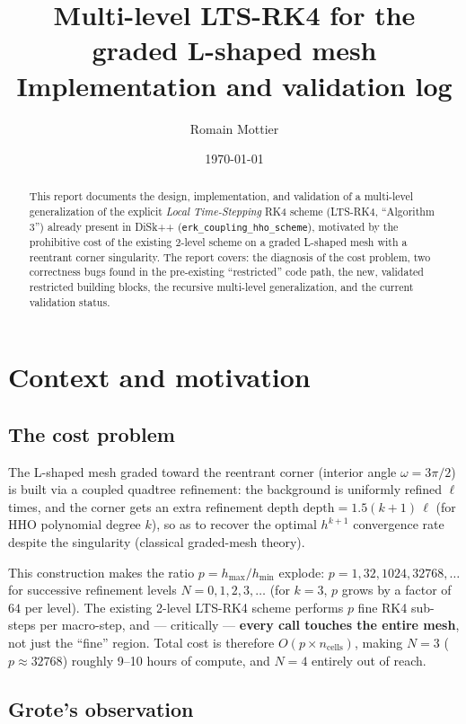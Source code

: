 \documentclass[11pt]{article}
\title{Multi-level LTS-RK4 for the graded L-shaped mesh\\
\large Implementation and validation log}
\author{Romain Mottier}
\date{\today}
\newcommand{\code}[1]{\texttt{#1}}
\begin{document}
\maketitle

\begin{abstract}
This report documents the design, implementation, and validation of a
multi-level generalization of the explicit \emph{Local Time-Stepping} RK4
scheme (LTS-RK4, ``Algorithm 3'') already present in DiSk++
(\code{erk\_coupling\_hho\_scheme}), motivated by the prohibitive cost of
the existing 2-level scheme on a graded L-shaped mesh with a reentrant
corner singularity. The report covers: the diagnosis of the cost problem,
two correctness bugs found in the pre-existing ``restricted'' code path,
the new, validated restricted building blocks, the recursive multi-level
generalization, and the current validation status.
\end{abstract}

\tableofcontents

\section{Context and motivation}

\subsection{The cost problem}

The L-shaped mesh graded toward the reentrant corner (interior angle
$\omega = 3\pi/2$) is built via a coupled quadtree refinement: the
background is uniformly refined $\ell$ times, and the corner gets an
extra refinement depth $\mathrm{depth} = 1.5(k+1)\,\ell$ (for HHO
polynomial degree $k$), so as to recover the optimal $h^{k+1}$
convergence rate despite the singularity (classical graded-mesh theory).

This construction makes the ratio $p = h_{\max}/h_{\min}$ explode:
$p = 1, 32, 1024, 32768,\dots$ for successive refinement levels
$N=0,1,2,3,\dots$ (for $k=3$, $p$ grows by a factor of $64$ per level).
The existing 2-level LTS-RK4 scheme performs $p$ fine RK4 sub-steps per
macro-step, and --- critically --- \textbf{every call touches the entire
mesh}, not just the ``fine'' region. Total cost is therefore
$O(p \times n_{\text{cells}})$, making $N=3$ ($p\approx 32768$) roughly
9--10 hours of compute, and $N=4$ entirely out of reach.

\subsection{Grote's observation}
\end{document}
